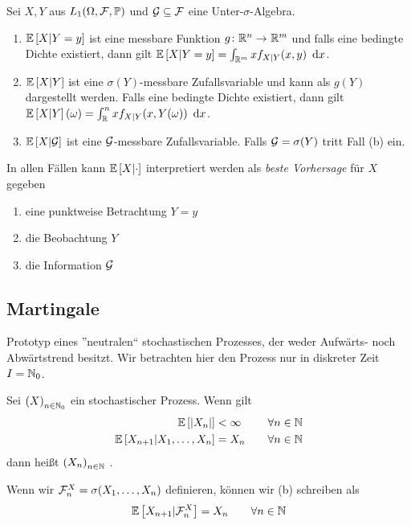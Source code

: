 Sei $X,Y$ aus $L_1(\Omega,\mathcal{F},\mathbb{P})$ und $\mathcal{G} \subseteq \mathcal{F}$ eine Unter-$\sigma$-Algebra. 
\begin{enumerate}[label=(\alph*),nolistsep,topsep=-\parskip]
	\item $\mathbb{E} \left[ X|Y=y \right]$ ist eine messbare Funktion $\abb{g}{\Rn}{\R^m}$ und falls eine bedingte Dichte existiert, dann gilt $\mathbb{E} \left[ X|Y=y \right] = \int_{\mathbb{R}^m} x f_{X|Y}(x,y) \enskip \mathrm{d}x$.
	\item $\mathbb{E} \left[ X|Y \right]$ ist eine $\sigma(Y)$-messbare Zufallsvariable und kann als $g(Y)$ dargestellt werden. Falls eine bedingte Dichte existiert, dann gilt $\mathbb{E} \left[ X|Y \right](\omega) = \int_\mathbb{R}^n x f_{X|Y}(x,Y(\omega)) \enskip \mathrm{d}x$.
	\item $\mathbb{E} \left[ X|\mathcal{G} \right]$ ist eine $\mathcal{G}$-messbare Zufallsvariable. Falls $\mathcal{G}=\sigma(Y)$ tritt Fall (b) ein.
\end{enumerate}
In allen Fällen kann $\mathbb{E} \left[ X|\cdot \right]$ interpretiert werden als \textit{beste Vorhersage} für $X$ gegeben
\begin{enumerate}[label=(\alph*),nolistsep,topsep=-\parskip]
	\item eine punktweise Betrachtung $Y=y$
	\item die Beobachtung $Y$
	\item die Information $\mathcal{G}$
\end{enumerate}

\subsection{Martingale}

Prototyp eines ''neutralen`` stochastischen Prozesses, der weder Aufwärts- noch Abwärtstrend besitzt. Wir betrachten hier den Prozess nur in diskreter Zeit $I = \mathbb{N}_0$.

\begin{definition}
	Sei $\left( X \right)_{n \in \mathbb{N}_0}$ ein stochastischer Prozess. Wenn gilt
	\begin{equation}
	\begin{alignedat}{2}
		\mathbb{E} \left[ \left| X_n \right| \right] &< \infty \qquad &\forall n \in \mathbb{N} \\
		\mathbb{E} \left[ X_{n+1}|X_1,\dots,X_n \right] &= X_n \qquad &\forall n \in \mathbb{N} \\
	\end{alignedat}
	\end{equation}
	dann heißt $\left( X_n \right)_{n \in \mathbb{N}}$ .
\end{definition}

Wenn wir $\mathcal{F}_n^X = \sigma(X_1,\dots,X_n)$ definieren, können wir (b) schreiben als 
\begin{equation*}
	\mathbb{E} \left[ X_{n+1}|\mathcal{F}_n^X \right] = X_n \qquad \forall n \in \mathbb{N}
\end{equation*}

